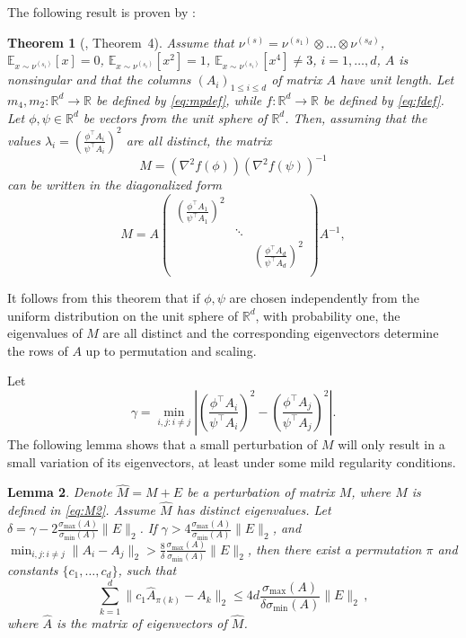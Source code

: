 \documentclass[english]{article} %
\newcommand{\E}{\mathbb{E}}
\newcommand{\ra}{\rightarrow}
\newcommand{\real}{\mathbb{R}}
\newtheorem{lemma}{Lemma}[section]
\newtheorem{thm}[lemma]{Theorem}
\theoremstyle{definition}
\begin{document}
The following result is proven by \citet{DHsu2012}:
\begin{thm}[\citet{DHsu2012}, Theorem~4]
Assume that $\nu^{(s)} = \nu^{(s_1)}\otimes \dots \otimes \nu^{(s_d)}$,
$\E_{x\sim \nu^{(s_i)}}[x] = 0$, $\E_{x\sim \nu^{(s_i)}}[x^2] = 1$, 
$\E_{x\sim \nu^{(s_i)}}[x^4] \ne 3$, $i=1,\ldots,d$, $A$ is nonsingular
and that the columns $(A_i)_{1\le i \le d}$ of matrix $A$ have unit length. 
Let $m_4,m_2:\real^d \ra \real$ be defined by \eqref{eq:mpdef},
	while $f: \real^d \ra \real$ be defined by \eqref{eq:fdef}.
Let $\phi,\psi\in \real^d$ be vectors from the unit sphere of $\real^d$. Then, 
	assuming that the values $\lambda_i = \left(\frac{\phi^{\top}A_i}{\psi^{\top}A_i}\right)^2$
	are all distinct,
	the matrix
\begin{equation}
\label{eq:M}
M =(\nabla^2f(\phi))(\nabla^2f(\psi))^{-1} 
\end{equation}
can be written in the diagonalized form
\begin{equation}
\label{eq:M2}
M = A 
\left(
\begin{array}{ccc}
\left(\frac{\phi^{\top}A_1}{\psi^{\top}A_1}\right)^2 & &\\
    & \ddots & \\
    & & \left(\frac{\phi^{\top}A_d}{\psi^{\top}A_d}\right)^2\\
\end{array} 
\right) 
A^{-1},
\end{equation}
\end{thm}
It follows from this theorem that 
if $\phi,\psi$ are chosen independently from the uniform distribution on the unit sphere of $\real^d$, with probability one,
the eigenvalues of  $M$ are all distinct and the corresponding eigenvectors
determine the rows of $A$ up to permutation and scaling.

Let 
\begin{equation}
\label{def:kappa}
\gamma =  \min_{i,j: i\neq j} \left\vert \left(\frac{\phi^{\top}A_i}{\psi^{\top}A_i}\right)^2 - \left(\frac{\phi^{\top}A_j}{\psi^{\top}A_j}\right)^2 \right\vert. 
\end{equation}
The following lemma shows that a small perturbation of $M$ will only result in a small variation of its eigenvectors, at least under some mild regularity conditions.

\begin{lemma}
\label{lem:eigenvectorvariation}
Denote $\widehat{M} = M+E$ be a perturbation of matrix $M$, where $M$ is defined in  \eqref{eq:M2}. 
Assume $\widehat{M}$ has distinct eigenvalues. Let $\delta = \gamma -  2 \frac{\sigma_{\max}(A)}{\sigma_{\min}(A)}\|E\|_2$. 
If $\gamma > 4 \frac{\sigma_{\max}(A)}{\sigma_{\min}(A)}\|E\|_2$, and $\min_{i,j:i\neq j} \|A_i - A_j\|_2 > \frac{8}{\delta}\frac{\sigma_{\max}(A)}{\sigma_{\min}(A) } \|E\|_2$, then there exist a permutation $\pi$ and constants $\{c_1,\ldots,c_d\}$, such that 
\[
\sum_{k=1}^{d}\| c_1\widehat{A}_{\pi(k)} - A_k\|_2 \le 4d  \frac{\sigma_{\max}(A)}{\delta \sigma_{\min}(A) } \|E\|_2\,,
\]
where $\widehat{A}$ is the matrix of eigenvectors of $\widehat{M}$. 
\end{lemma}
\end{document}
